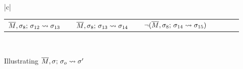 \begin{figure}[htb]
\begin{tabular}{|c|}
 \hline %
 \\
\hline
\begin{tabular}{lclclclcl}
 $\leadstoBounded  {\Mtwo} {\sigma_{12}} {\sigma_8}  {\sigma_{13}} $  & &   $\leadstoBounded  {\Mtwo} {\sigma_{13}}  {\sigma_{8}}  {\sigma_{14}} $ &  &
$\notLeadstoBounded  {\Mtwo} {\sigma_{14}} {\sigma_8}  {\sigma_{15}} $ & &  
\\

\end{tabular}
\\
\hline
\end{tabular}
   \caption{Illustrating   $\leadstoBounded  {\Mtwo} {\sigma_o} {\sigma}  {\sigma'}$
    }
   \label{fig:UpSemantics}
 \end{figure}

